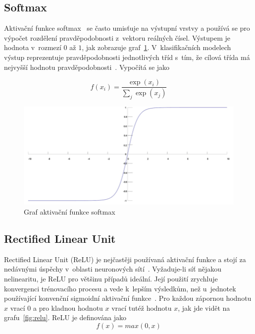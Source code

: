 \subsection*{Softmax}
Aktivační funkce softmax~\cite{mitdeeplearning} se často umisťuje na výstupní vrstvy a používá se pro výpočet rozdělení pravděpodobnosti z~vektoru reálných čísel. Výstupem je hodnota v~rozmezí $0$ až $1$, jak zobrazuje graf~\ref{fig:softmax}. V~klasifikačních modelech výstup reprezentuje pravděpodobnosti jednotlivých tříd s~tím, že cílová třída má nejvyšší hodnotu pravděpodobnosti~\cite{nwankpa2018activation}. Vypočítá se jako

\begin{equation}
  f(x_i) = \frac{\exp(x_i)}{\sum_j \exp(x_j)}
\end{equation}


\begin{figure}[H]
    \centering
    \includegraphics[scale=0.35]{obrazky-figures/softmax.png}
    \caption{\label{fig:softmax}Graf aktivační funkce softmax}
\end{figure}



\subsection*{Rectified Linear Unit}
\label{relu}
Rectified Linear Unit (ReLU) je nejčastěji používaná aktivační funkce a stojí za nedávnými úspěchy v~oblasti neuronových sítí~\cite{NIPS2012_4824}. Vyžaduje-li síť nějakou nelinearitu, je ReLU pro většinu případů ideální. Její použití zrychluje konvergenci trénovacího procesu a vede k~lepším výsledkům, než u~jednotek používající konvenční sigmoidní aktivační funkce~\cite{40811}. Pro každou zápornou hodnotu $x$ vrací $0$ a pro kladnou hodnotu $x$ vrací tutéž hodnotu $x$, jak jde vidět na grafu~\ref{fig:relu}. ReLU je definována jako 
\begin{equation}
   f(x)=max(0,x)
\end{equation}

